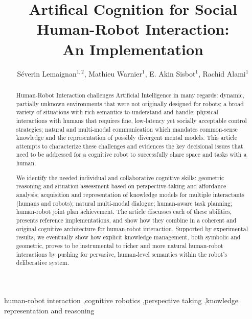 \documentclass[preprint,3p,times]{elsarticle}
\begin{document}
\begin{frontmatter}

\title{\LARGE \bf
Artifical Cognition for Social Human-Robot Interaction:\\ An Implementation
}

\author{Séverin Lemaignan$^{1,2}$, Mathieu Warnier$^1$, E. Akin Sisbot$^1$,
Rachid Alami$^1$}

\address{
$^1$CNRS, LAAS, 7 avenue du Colonel Roche, F-31400 Toulouse, France\\
Univ de Toulouse, LAAS, Toulouse, France\\
{\tt firstname.surname@laas.fr}
}

\address{
$^2$Centre for Robotics and Neural Systems\\
Plymouth University, Plymouth, United Kingdom\\
{\tt firstname.surname@plymouth.ac.uk}
}



\begin{abstract}

Human-Robot Interaction challenges Artificial Intelligence in many regards:
dynamic, partially unknown environments that were not originally designed for
robots; a broad variety of situations with rich semantics to understand and
handle; physical interactions with humans that requires fine, low-latency yet
socially acceptable control strategies; natural and multi-modal communication
which mandates common-sense knowledge and the representation of possibly
divergent mental models. This article attempts to characterize these challenges
and evidences the key decisional issues that need to be addressed for a
cognitive robot to successfully share space and tasks with a human.

We identify the needed individual and collaborative cognitive
skills: geometric reasoning and situation assessment based on perspective-taking
and affordance analysis; acquisition and representation of knowledge models for
multiple interactants (humans and robots); natural multi-modal dialogue;
human-aware task planning; human-robot joint plan achievement.  The article
discusses each of these abilities, presents reference implementations, and show
how they combine in a coherent and original cognitive architecture for
human-robot interaction. Supported by experimental results, we eventually show
how explicit knowledge management, both symbolic and geometric, proves to be
instrumental to richer and more natural human-robot interactions by pushing for
pervasive, human-level semantics within the robot's deliberative system.

\end{abstract}

\begin{keyword}
    human-robot interaction \sep cognitive robotics \sep perspective taking \sep knowledge representation and reasoning
\end{keyword}

\end{frontmatter}
\end{document}
